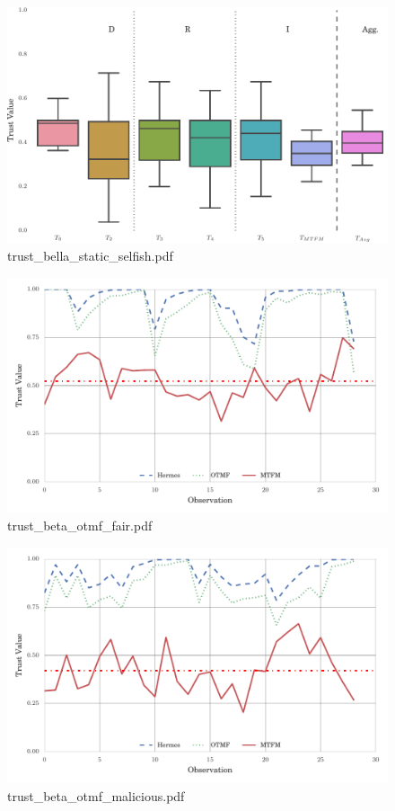 \documentclass{article}
\begin{document}
\begin{figure}[h!]
\centering
\includegraphics[width=\linewidth]{trust_bella_static_selfish.pdf}
\caption{trust\_bella\_static\_selfish.pdf}
\end{figure}




\begin{figure}[h!]
\centering
\includegraphics[width=\linewidth]{trust_beta_otmf_fair.pdf}
\caption{trust\_beta\_otmf\_fair.pdf}
\end{figure}




\begin{figure}[h!]
\centering
\includegraphics[width=\linewidth]{trust_beta_otmf_malicious.pdf}
\caption{trust\_beta\_otmf\_malicious.pdf}
\end{figure}
\end{document}
